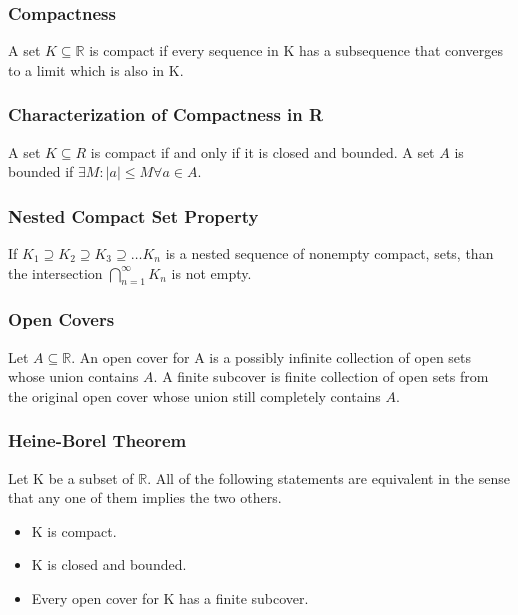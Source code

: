 \documentclass{article}
\begin{document}
\subsubsection{Compactness}

A set $ K \subseteq \mathbb{R} $ is compact if every sequence in K has a subsequence that converges to a limit which is also in K.

\subsubsection{Characterization of Compactness in R}
A set $ K \subseteq R$ is compact if and only if it is closed and bounded. A set $A$ is bounded if \( \exists M: |a| \leq M \forall a \in A     \).

\subsubsection{Nested Compact Set Property}

If \( K_1 \supseteq K_2 \supseteq K_3 \supseteq \ldots K_n    \) is a nested sequence of nonempty compact, sets, than the intersection \( \bigcap_{n=1}^{\infty} K_n      \) is not empty.

\subsubsection{Open Covers}

Let $ A \subseteq \mathbb{R} $. An open cover for A is a possibly infinite collection of open sets whose union contains $A$. A finite subcover is finite collection of open sets from the original open cover whose union still completely contains $A$.

\subsubsection{Heine-Borel Theorem}
Let K be a subset of $\mathbb{R}$. All of the following statements are equivalent in the sense that any one of them implies the two others.

\begin{itemize}

\item K is compact.

\item K is closed and bounded.

\item Every open cover for K has a finite subcover.

\end{itemize}
\end{document}
